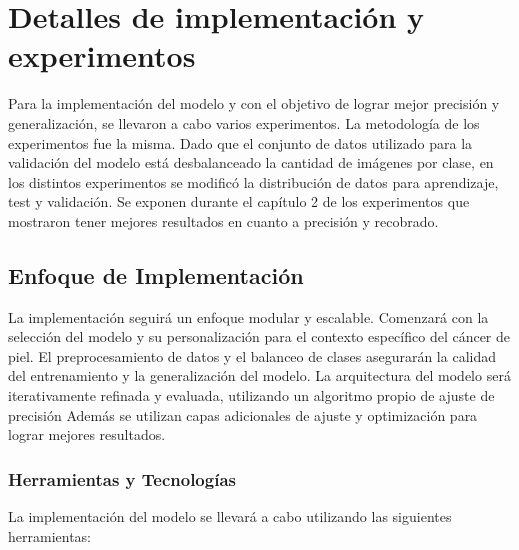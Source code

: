 \chapter{Detalles de implementación y experimentos}\label{chapter:implementation}

Para la implementación del modelo y con el objetivo de lograr mejor precisión y generalización, se llevaron a cabo varios experimentos. La metodología de los experimentos fue la misma. Dado que el conjunto de datos utilizado para la validación del modelo está desbalanceado la cantidad de imágenes por clase, en los distintos experimentos se modificó la distribución de datos para aprendizaje, test y validación. Se exponen durante el capítulo 2 de los experimentos que mostraron tener mejores resultados en cuanto a precisión y recobrado. 

\section{Enfoque de Implementación}

La implementación seguirá un enfoque modular y escalable. Comenzará con la selección del modelo y su personalización para el contexto específico del cáncer de piel. El preprocesamiento de datos y el balanceo de clases asegurarán la calidad del entrenamiento y la generalización del modelo. La arquitectura del modelo será iterativamente refinada y evaluada, utilizando un algoritmo propio de ajuste de precisión Además se utilizan capas adicionales de ajuste y optimización para lograr mejores resultados.

\subsection{Herramientas y Tecnologías}

La implementación del modelo se llevará a cabo utilizando las siguientes herramientas:

